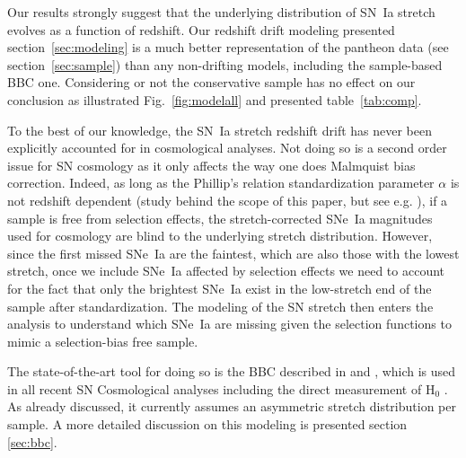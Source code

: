 \documentclass[]{aa} %
\newcommand{\mr}[1]{{\textcolor[rgb]{0.60,0.10,0.6}{#1}}}
\newcommand{\nn}[1]{{\textcolor[rgb]{1, 0.27, 0}{#1}}}
\begin{document}
\mr{Our results strongly suggest that the underlying distribution of SN~Ia
    stretch evolves as a function of redshift. Our redshift drift modeling
    presented section~\ref{sec:modeling} is a much better representation of the
    pantheon data (see section~\ref{sec:sample}) than any non-drifting models,
    including the sample-based BBC one. Considering or not the conservative
sample has no effect on our conclusion as illustrated Fig.~\ref{fig:modelall}
and presented table~\ref{tab:comp}.}

\mr{To the best of our knowledge, the SN~Ia stretch redshift drift has never
    been explicitly accounted for in cosmological analyses. Not doing so is a
    second order issue for SN cosmology as it only affects the way one does
    Malmquist bias correction. Indeed, as long as the Phillip's relation
    standardization parameter $\alpha$ is not redshift dependent (study behind
    the scope of this paper, but see e.g. \citealt{scolnic2018a}), if a sample
    is free from selection effects, the stretch-corrected SNe~Ia magnitudes used
    for cosmology are blind to the underlying stretch distribution.  However,
    since the first missed SNe~Ia are the faintest, which are also those with
    the lowest stretch, once we include SNe~Ia affected by selection effects we
    need to account for the fact that only the brightest SNe~Ia exist in the
    low-stretch end of the sample after standardization. The modeling of the SN
    stretch then enters the analysis to understand which SNe~Ia are missing
given the selection functions to mimic a selection-bias free sample.}

\mr{The state-of-the-art tool for doing so is the BBC described in
    \cite{scolnic2016} and \cite{kessler2017}, which is used in all recent SN
    Cosmological analyses \citep{jones2018b, scolnic2018a, brout2019,
    descosmopaper2019} including the direct measurement of H$_0$
\citep{riess2016,riess2019}. As already discussed, it currently assumes an
asymmetric stretch distribution per sample. \nn{A more detailed discussion on
this modeling is presented section \ref{sec:bbc}.}}
\end{document}
